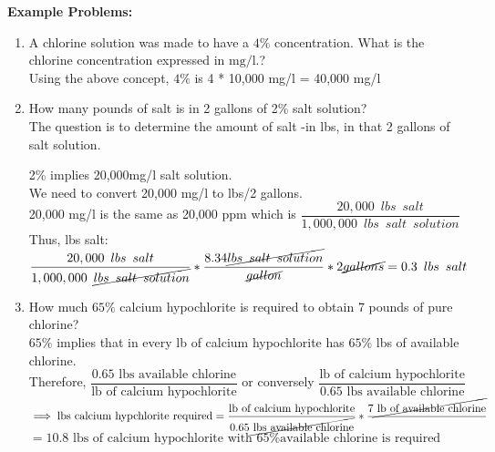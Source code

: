 \textbf{Example Problems:}\\
\begin{enumerate}[1.]
\item A chlorine solution was made to have a $4 \%$ concentration. What is the chlorine concentration expressed in $\mathrm{mg} / \mathrm{l}$.?\\

Using the above concept, $4 \%$ is 4 * 10,000 mg/l = 40,000 mg/l\\

\item How many pounds of salt is in 2 gallons of 2\% salt solution?\\
\vspace{0.2cm}
The question is to determine the amount of salt -in lbs, in that 2 gallons of salt solution.\\
\vspace{0.2cm}

2\% implies 20,000mg/l salt solution.\\

\vspace{0.2cm}
We need to convert 20,000 mg/l to lbs/2 gallons.\\
\vspace{0.2cm}
20,000 mg/l is the same as 20,000 ppm which is $\dfrac{20,000 \enspace lbs \enspace salt}{1,000,000 \enspace lbs \enspace salt \enspace solution}$\\
\vspace{0.2cm}
Thus, lbs salt:\\
\vspace{0.2cm}
$\dfrac{20,000 \enspace lbs \enspace salt}{1,000,000 \enspace \cancel{lbs \enspace salt \enspace solution}}*\dfrac{8.34 \cancel{lbs \enspace salt \enspace solution}}{\cancel{gallon}}*2 \cancel{gallons} =0.3 \enspace lbs \enspace salt$
\vspace{0.2cm}
\item How much $65 \%$ calcium hypochlorite is required to obtain 7 pounds of pure chlorine?\\
$65 \%$ implies that in every lb of calcium hypochlorite has $65 \%$ lbs of available chlorine.\\
\vspace{0.2cm}
Therefore, $\dfrac{0.65 \textrm{ lbs available chlorine}}{\textrm{lb of calcium hypochlorite}} $ or conversely $\dfrac{\textrm{lb of calcium hypochlorite}}{0.65 \textrm{ lbs available chlorine}}$\\
\vspace{0.2cm}
$\implies{\textrm{lbs calcium hypchlorite required}}=\dfrac{\textrm{lb of calcium hypochlorite}}{0.65 \cancel{\textrm{ lbs available chlorine}}}*\dfrac{7\cancel{\textrm{ lb of available chlorine}}}{}$\\
\vspace{0.2cm}
$=\boxed{10.8 \textrm{ lbs of calcium hypochlorite with } 65\%\textrm{available chlorine is required}}$
\end{enumerate}
